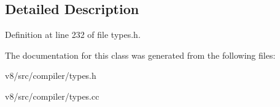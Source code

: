 \subsection{Detailed Description}


Definition at line 232 of file types.\+h.



The documentation for this class was generated from the following files\+:\begin{DoxyCompactItemize}
\item 
v8/src/compiler/types.\+h\item 
v8/src/compiler/types.\+cc\end{DoxyCompactItemize}

